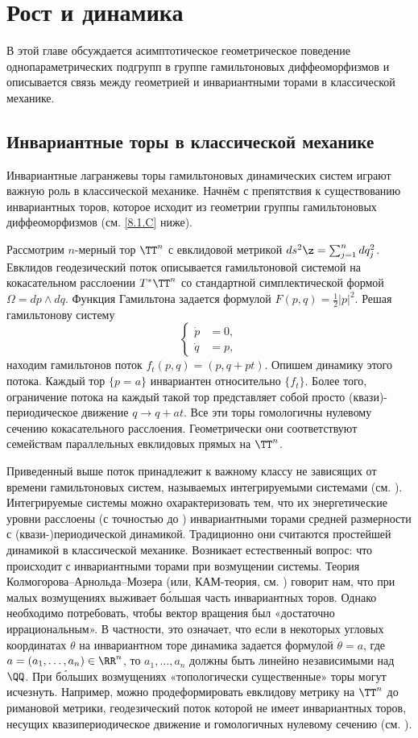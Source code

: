 \chapter{Рост и динамика}

В этой главе обсуждается асимптотическое геометрическое поведение однопараметрических подгрупп в группе гамильтоновых диффеоморфизмов и описывается связь между геометрией и инвариантными торами в классической механике.

\section{Инвариантные торы в классической механике}

Инвариантные лагранжевы торы гамильтоновых динамических систем играют важную роль в классической механике.
Начнём с препятствия к существованию инвариантных торов, которое исходит из геометрии группы гамильтоновых диффеоморфизмов (см. \ref{8.1.C} ниже).

Рассмотрим $n$-мерный тор $\TT^n$ с евклидовой метрикой $ds^2 \z= \sum^n_{j = 1} dq_j^2$.
Евклидов геодезический поток описывается гамильтоновой системой на кокасательном расслоении $T^\ast \TT^n$ со стандартной симплектической формой $\Omega = dp \wedge dq$.
Функция Гамильтона задается формулой $F (p, q) = \tfrac12 | p |^2$.
Решая гамильтонову систему 
\[
\begin{cases}
\dot p &= 0,\\
\dot q &= p,
\end{cases}
\]
находим гамильтонов поток $f_t (p, q) = (p, q + pt)$.
Опишем динамику этого потока.
Каждый тор $\{p = a\}$ инвариантен относительно $\{f_t\}$. 
Более того, ограничение потока на каждый такой тор представляет собой просто (квази)-периодическое движение $q \to q + at$.
Все эти торы гомологичны нулевому сечению кокасательного расслоения.
Геометрически они соответствуют семействам параллельных евклидовых прямых на $\TT^n$.

Приведенный выше поток принадлежит к важному классу не зависящих от времени гамильтоновых систем, называемых интегрируемыми системами (см. \cite{Ar}).
Интегрируемые системы можно охарактеризовать тем, что их энергетические уровни расслоены (с точностью до ) инвариантными торами средней размерности с (квази-)периодической динамикой.
Традиционно они считаются простейшей динамикой в классической механике.
Возникает естественный вопрос: что происходит с инвариантными торами при возмущении системы.
Теория Колмогорова--Арнольда--Мозера (или, КАМ-теория, см. \cite{Ar}) говорит нам, что при малых возмущениях выживает б\'{о}льшая часть инвариантных торов.
Однако необходимо потребовать, чтобы вектор вращения был «достаточно иррациональным».
В частности, это означает, что если в некоторых угловых координатах $\theta$ на инвариантном торе динамика задается формулой $\dot\theta = a$, где $a = (a_1 ,\dots, a_n) \in \RR^n$, то $a_1 ,\dots, a_n$ должны быть линейно независимыми над $\QQ$.
При б\'{о}льших возмущениях «топологически существенные» торы могут исчезнуть.
Например, можно продеформировать евклидову метрику на $\TT^n$ до римановой метрики, геодезический поток которой не имеет инвариантных торов, несущих квазипериодическое движение и гомологичных нулевому сечению (см. \cite{AL}).

